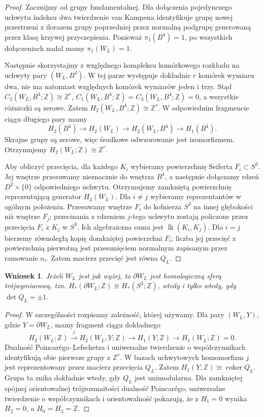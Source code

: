 \documentclass[11pt,a4paper]{report}
\numberwithin{equation}{section}
\theoremstyle{plain}
\newtheorem{wniosek}[twierdzenie]{Wniosek}
\theoremstyle{definition}
\theoremstyle{remark}
\begin{document}
\begin{proof}
Zacznijmy od grupy fundamentalnej. Dla dołączenia
pojedynczego uchwytu indeksu dwa twierdzenie van Kampena
identyfikuje grupę nowej przestrzeni z ilorazem grupy
poprzedniej przez normalną podgrupę generowaną przez
klasę krzywej przyczepienia. Ponieważ $\pi_1(B^4)=1$,
po wszystkich dołączeniach nadal mamy $\pi_1(W_L)=1$.

Następnie skorzystajmy z względnego kompleksu komórkowego
rozkładu na uchwyty pary $(W_L,B^4)$.
W tej parze występuje dokładnie $r$ komórek wymiaru dwa,
nie ma natomiast względnych komórek wymiarów jeden i trzy.
Stąd
$C_2(W_L,B^4;\mathbb Z)\cong\mathbb Z^r$,
$C_1(W_L,B^4;\mathbb Z)=C_3(W_L,B^4;\mathbb Z)=0$,
a wszystkie różniczki są zerowe. Zatem
$H_2(W_L,B^4;\mathbb Z)\cong\mathbb Z^r$.
W odpowiednim fragmencie ciągu długiego pary mamy
\[
H_2(B^4)\longrightarrow H_2(W_L)
\longrightarrow H_2(W_L,B^4)
\longrightarrow H_1(B^4).
\]
Skrajne grupy są zerowe, więc środkowe odwzorowanie
jest izomorfizmem. Otrzymujemy
$H_2(W_L;\mathbb Z)\cong\mathbb Z^r$.

Aby obliczyć przecięcia, dla każdego $K_i$ wybieramy
powierzchnię Seiferta $F_i\subset S^3$. Jej wnętrze
przesuwamy nieznacznie do wnętrza $B^4$, a następnie
dołączamy rdzeń $D^2\times\{0\}$ odpowiedniego uchwytu.
Otrzymujemy zamkniętą powierzchnię reprezentującą generator
$H_2(W_L)$. Dla $i\ne j$ wybieramy reprezentantów w ogólnym położeniu.
Przesuwamy wnętrze $F_i$ do kołnierza $S^3$ na innej
głębokości niż wnętrze $F_j$; przecinania z rdzeniem
$j$-tego uchwytu zostają policzone przez przecięcia
$F_i$ z $K_j$ w $S^3$. Ich algebraiczna suma jest
$\operatorname{lk}(K_i,K_j)$. Dla $i=j$ bierzemy
równoległą kopię domkniętej powierzchni $F_i$; liczba
jej przecięć z powierzchnią pierwotną jest przesunięciem
normalnym zapisanym przez ramowanie $n_i$. Zatem macierz przecięć jest równa $Q_L$.
\end{proof}

\begin{wniosek}
Jeżeli $W_L$ jest jak wyżej, to $\partial W_L$ jest
homologiczną sferą trójwymiarową, tzn.
$H_*(\partial W_L;\mathbb Z)\cong H_*(S^3;\mathbb Z)$,
wtedy i tylko wtedy, gdy $\det Q_L=\pm1$.
\end{wniosek}

\begin{proof}
W szczególności rozpiszmy zależność, której używamy.
Dla pary $(W_L,Y)$, gdzie $Y=\partial W_L$, mamy
fragment ciągu dokładnego
\[
H_2(W_L;\mathbb Z)\xrightarrow{j}
H_2(W_L,Y;\mathbb Z)\longrightarrow
H_1(Y;\mathbb Z)\longrightarrow H_1(W_L;\mathbb Z)=0.
\]
Dualność Poincarégo--Lefschetza i uniwersalne twierdzenie
o współczynnikach identyfikują obie pierwsze grupy z
$\mathbb Z^r$. W bazach uchwytowych homomorfizm $j$
jest reprezentowany przez macierz przecięcia $Q_L$.
Zatem $H_1(Y;\mathbb Z)\cong\operatorname{coker}Q_L$.
Grupa ta znika dokładnie wtedy, gdy $Q_L$ jest unimodularna. Dla zamkniętej spójnej orientowalnej
trójrozmaitości dualność Poincarégo, uniwersalne twierdzenie
o współczynnikach i orientowalność pokazują, że z
$H_1=0$ wynika $H_2=0$, a $H_0=H_3=\mathbb Z$.
\end{proof}
\end{document}
